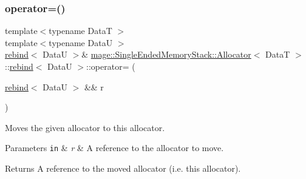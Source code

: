 \subsubsection{\texorpdfstring{operator=()}{operator=()}\hspace{0.1cm}{\footnotesize\ttfamily [2/2]}}
{\footnotesize\ttfamily template$<$typename DataT $>$ \\
template$<$typename DataU $>$ \\
\hyperlink{structmage_1_1_single_ended_memory_stack_1_1_allocator_1_1rebind}{rebind}$<$ DataU $>$\& \hyperlink{structmage_1_1_single_ended_memory_stack_1_1_allocator}{mage\+::\+Single\+Ended\+Memory\+Stack\+::\+Allocator}$<$ DataT $>$\+::\hyperlink{structmage_1_1_single_ended_memory_stack_1_1_allocator_1_1rebind}{rebind}$<$ DataU $>$\+::operator= (\begin{DoxyParamCaption}\item[{\hyperlink{structmage_1_1_single_ended_memory_stack_1_1_allocator_1_1rebind}{rebind}$<$ DataU $>$ \&\&}]{r }\end{DoxyParamCaption})\hspace{0.3cm}{\ttfamily [delete]}}

Moves the given allocator to this allocator.


\begin{DoxyParams}[1]{Parameters}
\mbox{\tt in}  & {\em r} & A reference to the allocator to move. \\
\hline
\end{DoxyParams}
\begin{DoxyReturn}{Returns}
A reference to the moved allocator (i.\+e. this allocator). 
\end{DoxyReturn}
